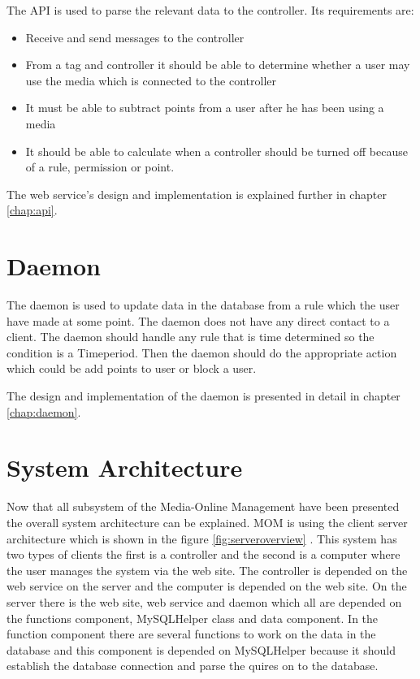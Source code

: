 The API is used to parse the relevant data to the controller. Its requirements are:

\begin{itemize}
	\item Receive and send messages to the controller
	\item From a tag and controller it should be able to determine whether a user may use the media which is connected to the controller
	\item It must be able to subtract points from a user after he has been using a media
	\item It should be able to calculate when a controller should be turned off because of a rule, permission or point.
\end{itemize}

The web service's design and implementation is explained further in chapter \vref{chap:api}.


\section{Daemon}
The daemon is used to update data in the database from a rule which the user have made at some point. The daemon does not have any direct contact to a client. The daemon should handle any rule that is time determined so the condition is a Timeperiod. Then the daemon should do the appropriate action which could be add points to user or block a user.

The design and implementation of the daemon is presented in detail in chapter \vref{chap:daemon}. 
 
\section{System Architecture}
\label{sec:sysArchitecture}
Now that all subsystem of the Media-Online Management have been presented the overall system architecture can be explained. MOM is using the client server architecture which is shown in the figure \ref{fig:serveroverview} \citep{OOAD}. This system has two types of clients the first is a controller and the second is a computer where the user manages the system via the web site. The controller is depended on the web service on the server and the computer is depended on the web site. On the server there is the web site, web service and daemon which all are depended on the functions component, MySQLHelper class and data component. In the function component there are several functions to work on the data in the database and this component is depended on MySQLHelper because it should establish the database connection and parse the quires on to the database. 

